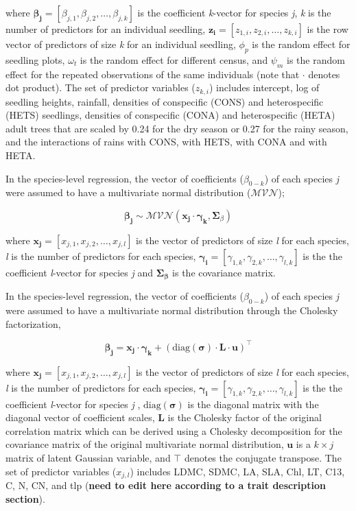 \documentclass[
  12pt,
  a4paper,
,tablecaptionabove
]{scrartcl}
\begin{document}
where
\(\boldsymbol{\beta_{j}} = \left[\beta_{j,1}, \beta_{j,2}, \ldots, \beta_{j,k} \right]\)
is the coefficient \emph{k}-vector for species \emph{j}, \emph{k} is the
number of predictors for an individual seedling,
\(\boldsymbol{z_i} = \left[z_{1,i}, z_{2,i}, \ldots, z_{k,i} \right]\)
is the row vector of predictors of size \emph{k} for an individual
seedling, \(\phi_p\) is the random effect for seedling plots,
\(\omega_t\) is the random effect for different census, and \(\psi_m\)
is the random effect for the repeated observations of the same
individuals (note that \(\cdot\) denotes dot product). The set of
predictor variables (\(z_{k,i}\)) includes intercept, log of seedling
heights, rainfall, densities of conspecific (CONS) and heterospecific
(HETS) seedlings, densities of conspecific (CONA) and heterospecific
(HETA) adult trees that are scaled by 0.24 for the dry season or 0.27
for the rainy season, and the interactions of rains with CONS, with
HETS, with CONA and with HETA.

In the species-level regression, the vector of coefficients
(\(\beta_{0-k}\)) of each species \emph{j} were assumed to have a
multivariate normal distribution (\(\mathcal{MVN}\));

\[
\boldsymbol{\beta_j} \sim  \mathcal{MVN}(\boldsymbol{x_j} \cdot \boldsymbol{\gamma_k}, {\boldsymbol \Sigma_{\beta}})
\]

where
\(\boldsymbol{x_{j}} = \left[x_{j,1}, x_{j,2}, \ldots, x_{j,l} \right]\)
is the vector of predictors of size \emph{l} for each species, \emph{l}
is the number of predictors for each species,
\(\boldsymbol{\gamma_i} = \left[\gamma_{1,k}, \gamma_{2,k}, \ldots, \gamma_{l,k} \right]\)
is the the coefficient \emph{l}-vector for species \emph{j} and
\(\boldsymbol{\Sigma_{\beta}}\) is the covariance matrix.

In the species-level regression, the vector of coefficients
(\(\beta_{0-k}\)) of each species \emph{j} were assumed to have a
multivariate normal distribution through the Cholesky factorization,

\[
\boldsymbol{\beta_j} = \boldsymbol{x_j} \cdot \boldsymbol{\gamma_k} + (\mathrm{diag}(\boldsymbol{\sigma})\cdot \boldsymbol{L} \cdot \boldsymbol{u})^\top
\]

where
\(\boldsymbol{x_{j}} = \left[x_{j,1}, x_{j,2}, \ldots, x_{j,l} \right]\)
is the vector of predictors of size \emph{l} for each species, \emph{l}
is the number of predictors for each species,
\(\boldsymbol{\gamma_i} = \left[\gamma_{1,k}, \gamma_{2,k}, \ldots, \gamma_{l,k} \right]\)
is the the coefficient \emph{l}-vector for species \emph{j} ,
\(\mathrm{diag}(\boldsymbol{\sigma})\) is the diagonal matrix with the
diagonal vector of coefficient scales, \(\boldsymbol{L}\) is the
Cholesky factor of the original correlation matrix which can be derived
using a Cholesky decomposition for the covariance matrix of the original
multivariate normal distribution, \(\boldsymbol{u}\) is a \(k \times j\)
matrix of latent Gaussian variable, and \(\top\) denotes the conjugate
transpose. The set of predictor variables (\(x_{j,l}\)) includes LDMC,
SDMC, LA, SLA, Chl, LT, C13, C, N, CN, and tlp (\textbf{need to edit
here according to a trait description section}).
\end{document}

